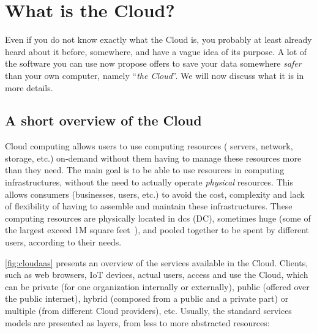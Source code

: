 \section{What is the Cloud?} %
\label{sec:cloud}

Even if you do not know exactly what the Cloud is, you probably at
least already heard about it before, somewhere, and have a vague idea
of its purpose.
%
A lot of the software you can use now propose offers to save your data
somewhere \emph{safer} than your own computer, namely ``\emph{the
Cloud}''.
%
We will now discuss what it is in more details.

\subsection{A short overview of the Cloud}
\label{ssec:cloud-overview}

Cloud computing allows users to use computing resources (\eg
\glspl{server}, network, storage, etc.) on-demand without them having
to manage these resources more than they need.
%
The main goal is to be able to use resources in computing
infrastructures, without the need to actually operate \emph{physical}
resources.
%
This allows consumers (businesses, users, etc.) to avoid the cost,
complexity and lack of flexibility of having to assemble and maintain
these infrastructures.
%
These computing resources are physically located in \glspl{dc} (\acrshort{DC}),
sometimes huge (some of the largest exceed 1M square
feet~\cite{rankeddc}), and pooled together to
be spent by different users, according to their needs.


\autoref{fig:cloudaas} presents an overview of the services available
in the Cloud.
%
Clients, such as web browsers, IoT devices, actual users, access and
use the Cloud, which can be private (for one organization internally
or externally), public (offered over the public internet), hybrid
(composed from a public and a private part) or multiple (from
different Cloud providers), etc.
%
Usually, the standard services models are presented as layers, from
less to more abstracted resources:

